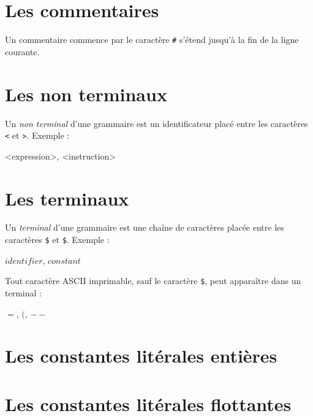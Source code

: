 \section{Les commentaires}

Un commentaire commence par le caractère \texttt{\#} s'étend jusqu'à la fin de la ligne courante.








\section{Les non terminaux}

Un \emph{non terminal} d'une grammaire est un identificateur placé entre les caractères \texttt{<} et \texttt{>}. Exemple :

\begin{galgas}
 <expression>, <instruction>
\end{galgas}







\section{Les terminaux}

Un \emph{terminal} d'une grammaire est une chaîne de caractères placée entre les caractères \texttt{\$} et \texttt{\$}. Exemple :

\begin{galgas}
 $identifier$, $constant$
\end{galgas}

Tout caractère ASCII imprimable, sauf le caractère \texttt{\$}, peut apparaître dans un terminal :
\begin{galgas}
 $=$, $($, $--$
\end{galgas}


\section{Les constantes litérales entières}




\section{Les constantes litérales flottantes}



